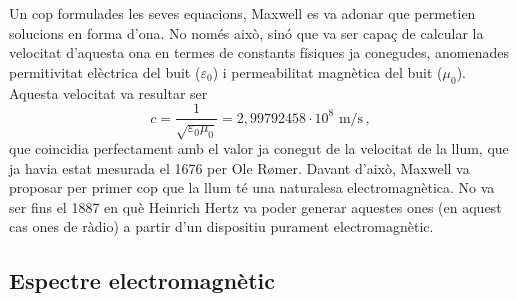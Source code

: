 \documentclass[12pt]{book}
\begin{document}
Un cop formulades les seves equacions, Maxwell es va adonar que permetien solucions en forma d'ona. No només això, sinó que va ser capaç de calcular la velocitat d'aquesta ona en termes de constants físiques ja conegudes, anomenades permitivitat elèctrica del buit ($\varepsilon_0$) i permeabilitat magnètica del buit ($\mu_0$). Aquesta velocitat va resultar ser
%
\begin{equation}
    c = \frac{1}{\sqrt{\varepsilon_0 \mu_0}} = 2,99792458 \cdot 10^8 \text{ m/s} \, ,
\end{equation}
%
que coincidia perfectament amb el valor ja conegut de la velocitat de la llum, que ja havia estat mesurada el 1676 per Ole Rømer. Davant d'això, Maxwell va proposar per primer cop que la llum té una naturalesa electromagnètica. No va ser fins el 1887 en què Heinrich Hertz va poder generar aquestes ones (en aquest cas ones de ràdio) a partir d'un dispositiu purament electromagnètic.

\subsection{Espectre electromagnètic}
\end{document}
